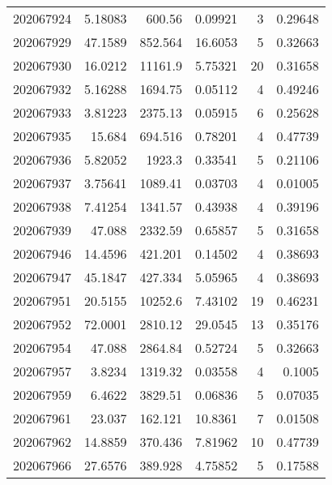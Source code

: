 \begin{tabular}{rrrrrr}
 202067924 &          5.18083 &      600.56   &            0.09921 &           3 & 0.29648 \\
 202067929 &         47.1589  &      852.564  &           16.6053  &           5 & 0.32663 \\
 202067930 &         16.0212  &    11161.9    &            5.75321 &          20 & 0.31658 \\
 202067932 &          5.16288 &     1694.75   &            0.05112 &           4 & 0.49246 \\
 202067933 &          3.81223 &     2375.13   &            0.05915 &           6 & 0.25628 \\
 202067935 &         15.684   &      694.516  &            0.78201 &           4 & 0.47739 \\
 202067936 &          5.82052 &     1923.3    &            0.33541 &           5 & 0.21106 \\
 202067937 &          3.75641 &     1089.41   &            0.03703 &           4 & 0.01005 \\
 202067938 &          7.41254 &     1341.57   &            0.43938 &           4 & 0.39196 \\
 202067939 &         47.088   &     2332.59   &            0.65857 &           5 & 0.31658 \\
 202067946 &         14.4596  &      421.201  &            0.14502 &           4 & 0.38693 \\
 202067947 &         45.1847  &      427.334  &            5.05965 &           4 & 0.38693 \\
 202067951 &         20.5155  &    10252.6    &            7.43102 &          19 & 0.46231 \\
 202067952 &         72.0001  &     2810.12   &           29.0545  &          13 & 0.35176 \\
 202067954 &         47.088   &     2864.84   &            0.52724 &           5 & 0.32663 \\
 202067957 &          3.8234  &     1319.32   &            0.03558 &           4 & 0.1005  \\
 202067959 &          6.4622  &     3829.51   &            0.06836 &           5 & 0.07035 \\
 202067961 &         23.037   &      162.121  &           10.8361  &           7 & 0.01508 \\
 202067962 &         14.8859  &      370.436  &            7.81962 &          10 & 0.47739 \\
 202067966 &         27.6576  &      389.928  &            4.75852 &           5 & 0.17588 \\

\end{tabular}
